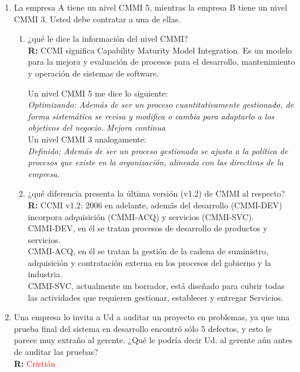 \begin{enumerate}
	\item  La empresa A tiene un nivel CMMI 5, mientras la empresa B tiene un nivel CMMI 3. Usted debe contratar a una de ellas.
		\begin{enumerate}
			\item ¿qué le dice la información del nivel CMMI?\\
			\textbf{R:}
			CCMI significa Capability Maturity Model Integration.
			Es un modelo para la mejora y evaluación de procesos para el desarrollo, mantenimiento y operación de sistemas de software.
			
			Un nivel CMMI 5 me dice lo siguiente:\\
			\emph{Optimizando: Además de ser un proceso cuantitativamente gestionado, de forma sistemática se revisa y modifica o cambia para adaptarlo a los objetivos del negocio. Mejora continua}\\
			Un nivel CMMI 3 analogamente:\\
			\emph{Definido: Además de ser un proceso gestionado se ajusta a la política de procesos que existe en la organización, alineada con las directivas de la empresa.}
				
			\item ¿qué diferencia presenta la última versión (v1.2) de CMMI al respecto?\\
			\textbf{R:}
			CCMI v1.2: 2006 en adelante, además del desarrollo (CMMI-DEV) incorpora adquisición (CMMI-ACQ) y servicios (CMMI-SVC).\\
			CMMI-DEV, en él se tratan procesos de desarrollo de productos y servicios.\\
			CMMI-ACQ, en él se tratan la gestión de la cadena de suministro, adquisición y contratación externa en los procesos del gobierno y la industria.\\
			CMMI-SVC, actualmente un borrador, está diseñado para cubrir todas las actividades que requieren gestionar, establecer y entregar Servicios.\\
			
		\end{enumerate}
	\item Una empresa lo invita a Ud a auditar un proyecto en problemas, ya que una prueba final del sistema en desarrollo encontró sólo 5 defectos, y esto le parece muy extraño al gerente. ¿Qué le podría decir Ud. al gerente aún antes de auditar las pruebas?\\
	\textbf{R:}
	\textcolor{red}{Cristián}


\end{enumerate}
